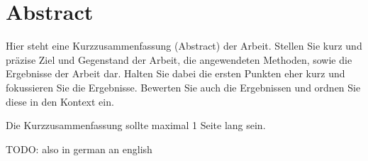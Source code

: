 \chapter*{Abstract}
Hier steht eine Kurzzusammenfassung (Abstract) der Arbeit. Stellen Sie kurz und präzise Ziel und Gegenstand der Arbeit, die angewendeten Methoden, sowie die Ergebnisse der Arbeit dar. Halten Sie dabei die ersten Punkten eher kurz und fokussieren Sie die Ergebnisse. Bewerten Sie auch die Ergebnissen und ordnen Sie diese in den Kontext ein.

Die Kurzzusammenfassung sollte maximal 1 Seite lang sein.

\par{TODO: also in german an english}